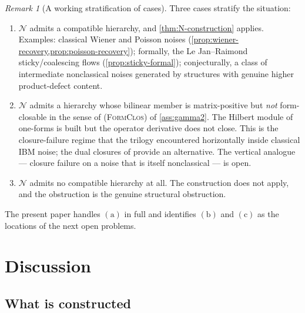 \documentclass[11pt,reqno]{amsart}
\theoremstyle{plain}
\theoremstyle{definition}
\theoremstyle{remark}
\newtheorem{remark}[theorem]{Remark}
\newcommand{\cN}{\mathcal N}
\begin{document}
\begin{remark}[A working stratification of cases]\label{rem:stratification}
Three cases stratify the situation:
\begin{enumerate}
\item[$(\mathrm a)$] $\cN$ admits a compatible hierarchy, and
\cref{thm:N-construction} applies. Examples: classical Wiener
and Poisson noises (\cref{prop:wiener-recovery,prop:poisson-recovery});
formally, the Le Jan--Raimond sticky/coalescing flows
(\cref{prop:sticky-formal}); conjecturally, a class of
intermediate nonclassical noises generated by structures with
genuine higher product-defect content.
\item[$(\mathrm b)$] $\cN$ admits a hierarchy whose bilinear
member is matrix-positive but \emph{not} form-closable in the
sense of \textsc{(FormClos)} of \cref{ass:gamma2}. The Hilbert
module of one-forms is built but the operator derivative does
not close. This is the closure-failure regime that the trilogy
\cite{EnergyFirst,FCDC,BidegreeAtlas} encountered horizontally
inside classical IBM noise; the dual closures of
\cite{FCDC,BidegreeAtlas} provide an alternative. The vertical
analogue --- closure failure on a noise that is itself
nonclassical --- is open.
\item[$(\mathrm c)$] $\cN$ admits no compatible hierarchy at
all. The construction does not apply, and the obstruction is
the genuine structural obstruction.
\end{enumerate}
The present paper handles $(\mathrm a)$ in full and identifies
$(\mathrm b)$ and $(\mathrm c)$ as the locations of the next
open problems.
\end{remark}

\section{Discussion}\label{sec:discussion}

\subsection{What is constructed}\label{sec:disc-constructed}
\end{document}
